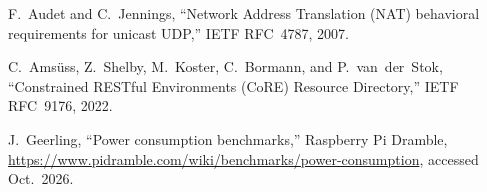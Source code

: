 
F.~Audet and C.~Jennings,
``Network Address Translation (NAT) behavioral requirements for unicast UDP,''
IETF RFC~4787, 2007.

C.~Ams\"{u}ss, Z.~Shelby, M.~Koster, C.~Bormann, and P.~van~der~Stok,
``Constrained RESTful Environments (CoRE) Resource Directory,''
IETF RFC~9176, 2022.

J.~Geerling,
``Power consumption benchmarks,''
Raspberry Pi Dramble, \url{https://www.pidramble.com/wiki/benchmarks/power-consumption}, accessed Oct.~2026.
